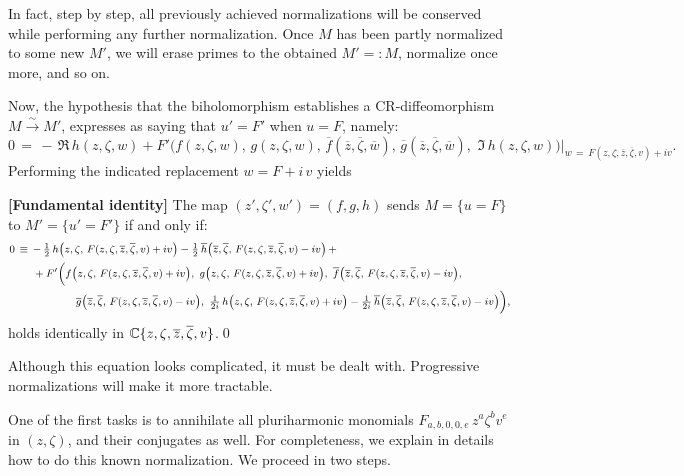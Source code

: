 \documentclass[12pt,twoside,leqno,openany]{amsart}
\begin{document}
In fact, step by step, all previously achieved normalizations
will be conserved while performing any further normalization.
Once $M$ has been partly normalized to some new $M'$,
we will erase primes to the obtained $M' =: M$,
normalize once more, and so on.

Now, the hypothesis that the biholomorphism establishes a
CR-diffeomorphism $M \overset{\sim}{\longrightarrow} M'$, expresses as
saying that $u' = F'$ when $u = F$, namely:
\[
0
\,=\,
-\,
\Re\,
h(z,\zeta,w)
+
F'
\Big(
f(z,\zeta,w),\,
g(z,\zeta,w),\,
\overline{f}(\overline{z},\overline{\zeta},\overline{w}),\,
\overline{g}(\overline{z},\overline{\zeta},\overline{w}),\,\,
\Im\,
h(z,\zeta,w)
\Big)
\bigg\vert_{w\,=\,F(z,\zeta,\overline{z},\overline{\zeta},v)+iv}.
\]
Performing the indicated replacement
$w = F + i\,v$ yields 

\begin{Lemma}
\label{Lm-fundamental-identity}
{\bf [Fundamental identity]}
The map $(z', \zeta', w') = (f,g,h)$ sends $M = \{ u = F \}$ 
to $M' = \{u' = F'\}$ if and only if:
\[
\footnotesize
\aligned
0
&
\,\equiv\,
-\,
{\textstyle{\frac{1}{2}}}\,
h
\big(
z,\zeta,\,
F(z,\zeta,\overline{z},\overline{\zeta},v)+iv
\big)
-
{\textstyle{\frac{1}{2}}}\,
\overline{h}
\big(
\overline{z},\overline{\zeta},\,
F(z,\zeta,\overline{z},\overline{\zeta},v)-iv
\big)
\,+
\notag
\\
&
\ \ \ \ \
+
F'
\Big(
f
\big(
z,\zeta,\,
F(z,\zeta,\overline{z},\overline{\zeta},v)+iv
\big),\,\,
g
\big(
z,\zeta,\,
F(z,\zeta,\overline{z},\overline{\zeta},v)+iv
\big),\,\,
\overline{f}
\big(
\overline{z},\overline{\zeta},\,
F(z,\zeta,\overline{z},\overline{\zeta},v)-iv
\big),\,\,
\notag
\\
&
\ \ \ \ \ \ \ \ \ \ \ \ \ \ \ \ \
\overline{g}
\big(
\overline{z},\overline{\zeta},\,
F(z,\zeta,\overline{z},\overline{\zeta},v)-iv
\big),\,\,
{\textstyle{\frac{1}{2i}}}\,
h
\big(
z,\zeta,\,
F(z,\zeta,\overline{z},\overline{\zeta},v)+iv
\big)
-
{\textstyle{\frac{1}{2i}}}\,
\overline{h}
\big(
\overline{z},\overline{\zeta},\,
F(z,\zeta,\overline{z},\overline{\zeta},v)-iv
\big)
\Big),
\endaligned
\]
holds identically in $\mathbb{C} \{ z, \zeta, \overline{z}, 
\overline{\zeta}, v \}$.\qed
\end{Lemma}

Although this equation
looks complicated, it must be dealt with.  Progressive normalizations
will make it more tractable.

One of the first tasks is to annihilate all pluriharmonic monomials
$F_{a,b,0,0,e}\, {z}^a {\zeta}^b {v}^e$ in $(z, \zeta)$, 
and their conjugates as
well. For completeness, we explain in details how to do this known
normalization.  We proceed in two
steps. 
\end{document}
